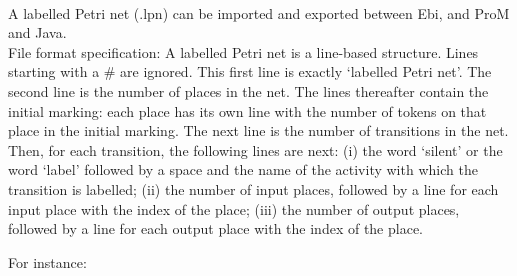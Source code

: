 {\\A labelled Petri net (.lpn) can be imported and exported between Ebi, and ProM and Java.
\\File format specification:
A labelled Petri net is a line-based structure. Lines starting with a \# are ignored.
    This first line is exactly `labelled Petri net'.
    The second line is the number of places in the net.
    The lines thereafter contain the initial marking: each place has its own line with the number of tokens on that place in the initial marking.
    The next line is the number of transitions in the net.
    Then, for each transition, the following lines are next: 
    (i) the word `silent' or the word `label' followed by a space and the name of the activity with which the transition is labelled;
    (ii) the number of input places, followed by a line for each input place with the index of the place;
    (iii) the number of output places, followed by a line for each output place with the index of the place.
    
    For instance:
    
\clearpage
}
